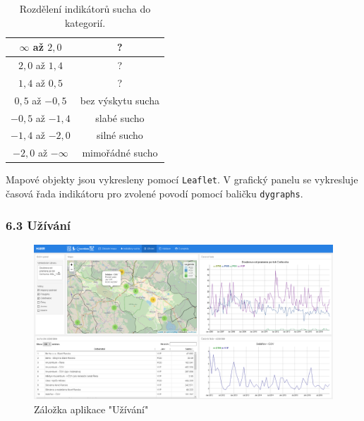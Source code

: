 \documentclass[12pt,]{article}
\begin{document}
\begin{table}[H]
\centering
\begin{tabular}{|c|c|}
\hline
$\infty$ až $2,0$   & ?                 \\ \hline
$2,0$ až $1,4$      & ?                 \\ \hline
$1,4$ až $0,5$      & ?                 \\ \hline
$0,5$ až $-0,5$     & bez výskytu sucha \\ \hline
$-0,5$ až $-1,4$    & slabé sucho       \\ \hline
$-1,4$ až $-2,0$    & silné sucho       \\ \hline
$-2,0$ až $-\infty$ & mimořádné sucho   \\ \hline
\end{tabular}
\caption{Rozdělení indikátorů sucha do kategorií.}
\label{tab9}
\end{table}

\vspace*{-0.3cm}

\qquad Mapové objekty jsou vykresleny pomocí \texttt{Leaflet}. V
grafický panelu se vykresluje časová řada indikátoru pro zvolené povodí
pomocí baličku \texttt{dygraphs}.

\subsubsection{6.3 Užívání}\label{uzivani}

\begin{figure}[H]
      \includegraphics[width=\textwidth]{fig/P_uzivani}
      \caption{Záložka aplikace "Užívání"}
      \label{fig:ch5.5}
\end{figure}

\vspace*{-0.3cm}
\end{document}
